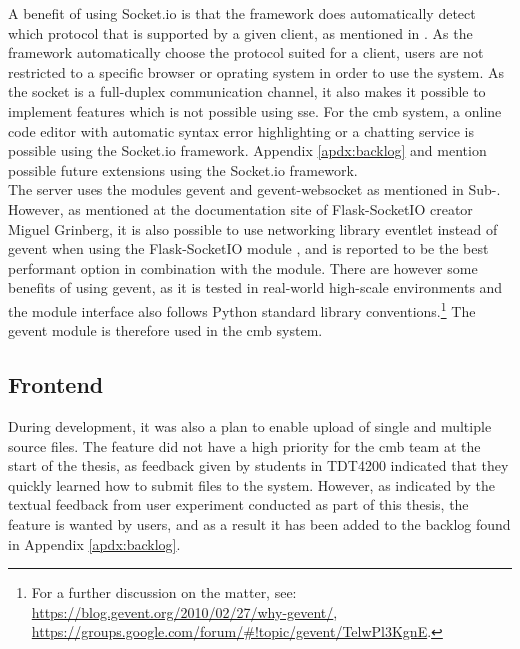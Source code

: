 A benefit of using Socket.io is that the framework does automatically detect which protocol that is supported by a given client, as mentioned in . As the framework automatically choose the protocol suited for a client, users are not restricted to a specific browser or oprating system in order to use the system. As the socket is a full-duplex communication channel, it also makes it possible to implement features which is not possible using \gls{sse}. For the \gls{cmb} system, a online code editor with automatic syntax error highlighting or a chatting service is possible using the Socket.io framework. Appendix \ref{apdx:backlog} and  mention possible future extensions using the Socket.io framework. \\

The server uses the modules gevent \cite{GEVENT} and gevent-websocket \cite{GEVENTWEBSOCKET} as mentioned in Sub-. However, as mentioned at the documentation site of Flask-SocketIO creator Miguel Grinberg, it is also possible to use networking library eventlet \cite{EVENTLET} instead of gevent when using the Flask-SocketIO module \cite{FLASKSOCKETIO}, and is reported to be the best performant option in combination with the module. There are however some benefits of using gevent, as it is tested in real-world high-scale environments and the module interface also follows Python standard library conventions.\footnote{For a further discussion on the matter, see: \url{https://blog.gevent.org/2010/02/27/why-gevent/}, \url{https://groups.google.com/forum/\#!topic/gevent/TelwPl3KgnE}.} The gevent module is therefore used in the \gls{cmb} system.

\subsection{Frontend}
During development, it was also a plan to enable upload of single and multiple source files. The feature did not have a high priority for the \gls{cmb} team at the start of the thesis, as feedback given by students in TDT4200 indicated that they quickly learned how to submit files to the system. However, as indicated by the textual feedback from user experiment conducted as part of this thesis, the feature is wanted by users, and as a result it has been added to the backlog found in Appendix \ref{apdx:backlog}.


